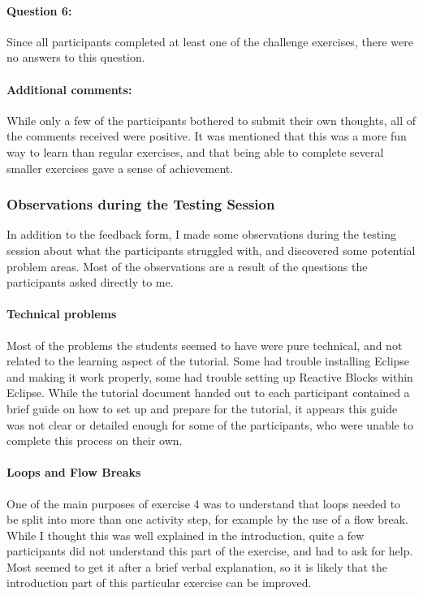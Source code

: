 \paragraph{Question 6:} Since all participants completed at least one of the challenge exercises, there were no answers to this question.

\paragraph{Additional comments:} While only a few of the participants bothered to submit their own thoughts, all of the comments received were positive. It was mentioned that this was a more fun way to learn than regular exercises, and that being able to complete several smaller exercises gave a sense of achievement.

\subsubsection{Observations during the Testing Session}
In addition to the feedback form, I made some observations during the testing session about what the participants struggled with, and discovered some potential problem areas. Most of the observations are a result of the questions the participants asked directly to me.

\paragraph{Technical problems} Most of the problems the students seemed to have were pure technical, and not related to the learning aspect of the tutorial. Some had trouble installing Eclipse and making it work properly, some had trouble setting up Reactive Blocks within Eclipse. While the tutorial document handed out to each participant contained a brief guide on how to set up and prepare for the tutorial, it appears this guide was not clear or detailed enough for some of the participants, who were unable to complete this process on their own.

\paragraph{Loops and Flow Breaks} One of the main purposes of exercise 4 was to understand that loops needed to be split into more than one activity step, for example by the use of a flow break. While I thought this was well explained in the introduction, quite a few participants did not understand this part of the exercise, and had to ask for help. Most seemed to get it after a brief verbal explanation, so it is likely that the introduction part of this particular exercise can be improved.


